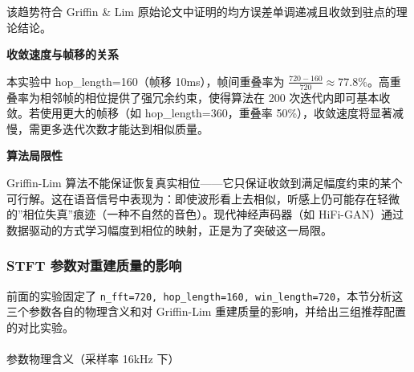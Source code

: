 \documentclass[
  english,
  letterpaper,
  DIV=11,
  numbers=noendperiod]{scrartcl}
\makeatletter
\let\oldparagraph\paragraph
\renewcommand{\paragraph}{
    \@ifstar
      \xxxParagraphStar
      \xxxParagraphNoStar
  }
\newcommand{\xxxParagraphStar}[1]{\oldparagraph*{#1}\mbox{}}
\newcommand{\xxxParagraphNoStar}[1]{\oldparagraph{#1}\mbox{}}
\makeatother
\begin{document}
该趋势符合 Griffin \& Lim
原始论文中证明的均方误差单调递减且收敛到驻点的理论结论。

\textbf{收敛速度与帧移的关系}

本实验中 hop\_length=160（帧移 10ms），帧间重叠率为
\(\frac{720-160}{720} \approx 77.8\%\)。高重叠率为相邻帧的相位提供了强冗余约束，使得算法在
200 次迭代内即可基本收敛。若使用更大的帧移（如 hop\_length=360，重叠率
50\%），收敛速度将显著减慢，需更多迭代次数才能达到相似质量。

\textbf{算法局限性}

Griffin-Lim
算法不能保证恢复真实相位------它只保证收敛到满足幅度约束的某个可行解。这在语音信号中表现为：即使波形看上去相似，听感上仍可能存在轻微的''相位失真''痕迹（一种不自然的音色）。现代神经声码器（如
HiFi-GAN）通过数据驱动的方式学习幅度到相位的映射，正是为了突破这一局限。

\subsubsection{STFT
参数对重建质量的影响}\label{stft-ux53c2ux6570ux5bf9ux91cdux5efaux8d28ux91cfux7684ux5f71ux54cd}

前面的实验固定了
\texttt{n\_fft=720,\ hop\_length=160,\ win\_length=720}，本节分析这三个参数各自的物理含义和对
Griffin-Lim 重建质量的影响，并给出三组推荐配置的对比实验。

\paragraph{参数物理含义（采样率 16kHz
下）}\label{ux53c2ux6570ux7269ux7406ux542bux4e49ux91c7ux6837ux7387-16khz-ux4e0b}
\end{document}
